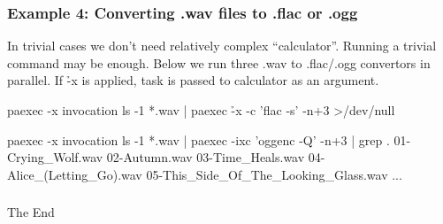 \documentclass[hyperref={colorlinks=true}]{beamer}
\begin{document}
\begin{frame}[fragile]
  \frametitle{Example 4: Converting .wav files to .flac or .ogg}
In trivial cases we don't need relatively complex ``calculator''.
Running a trivial command may be enough.
Below we run three .wav to .flac/.ogg convertors in parallel.
If \h{-x} is applied, task is passed to calculator as an argument.
\begin{block}{}
  \begin{CodeSmall}{paexec -x invocation}
\prompt{\$} ls -1 *.wav | paexec \h{-x} -c 'flac -s' -n+3 >/dev/null
\prompt{\$}
  \end{CodeSmall}
\end{block}
\begin{block}{}
  \begin{CodeSmall}{paexec -x invocation}
\prompt{\$} ls -1 *.wav | paexec -ixc 'oggenc -Q' -n+3 | grep .
01-Crying_Wolf.wav
02-Autumn.wav
03-Time_Heals.wav
04-Alice_(Letting_Go).wav
05-This_Side_Of_The_Looking_Glass.wav
...
\prompt{\$}
  \end{CodeSmall}
\end{block}
\end{frame}

\begin{frame}[fragile]
  \frametitle{}
  \begin{center}
    \huge
    The End
  \end{center}
\end{frame}

\end{document}
